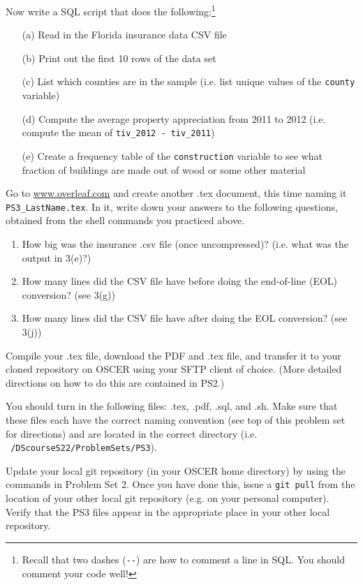 \documentclass[12pt,english]{exam}
\begin{document}
\begin{questions}
\question Now write a SQL script that does the following:\footnote{Recall that two dashes (\texttt{-{}-}) are how to comment a line in SQL. You should comment your code well!}
\begin{itemize}
	\item[(a)] Read in the Florida insurance data CSV file
	\item[(b)] Print out the first 10 rows of the data set
	\item[(c)] List which counties are in the sample (i.e. list unique values of the \texttt{county} variable)
	\item[(d)] Compute the average property appreciation from 2011 to 2012 (i.e. compute the mean of \texttt{tiv\_2012 - tiv\_2011})
	\item[(e)] Create a frequency table of the \texttt{construction} variable to see what fraction of buildings are made out of wood or some other material
\end{itemize}

\question Go to \url{www.overleaf.com} and create another .tex document, this time naming it \texttt{PS3\_LastName.tex}. In it, write down your answers to the following questions, obtained from the shell commands you practiced above.
\begin{enumerate}
	\item How big was the insurance .csv file (once uncompressed)? (i.e. what was the output in 3(e)?)
	\item How many lines did the CSV file have before doing the end-of-line (EOL) conversion? (see 3(g))
	\item How many lines did the CSV file have after doing the EOL conversion? (see 3(j))
\end{enumerate}

\question Compile your .tex file, download the PDF and .tex file, and transfer it to your cloned repository on OSCER using your SFTP client of choice. (More detailed directions on how to do this are contained in PS2.)

\question You should turn in the following files: .tex, .pdf, .sql, and .sh. Make sure that these files each have the correct naming convention (see top of this problem set for directions) and are located in the correct directory (i.e. \texttt{~/DScourseS22/ProblemSets/PS3}).

\question Update your local git repository (in your OSCER home directory) by using the commands in Problem Set 2. Once you have done this, issue a \texttt{git pull} from the location of your other local git repository (e.g. on your personal computer). Verify that the PS3 files appear in the appropriate place in your other local repository.


\end{questions}
\end{document}
